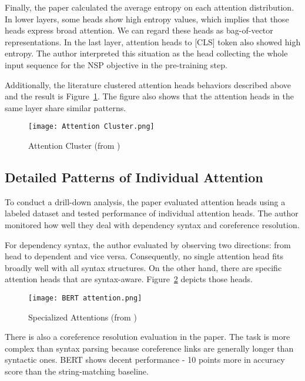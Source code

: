\documentclass[letterpaper, 11pt]{article}
\begin{document}
Finally, the paper calculated the average entropy on each attention distribution. In lower layers, some heads show high entropy values, which implies that those heads express broad attention. We can regard these heads as bag-of-vector representations. In the last layer, attention heads to [CLS] token also showed high entropy. The author interpreted this situation as the head collecting the whole input sequence for the NSP objective in the pre-training step.

Additionally, the literature clustered attention heads behaviors described above and the result is Figure~\ref{fig:attention-cluster}. The figure also shows that the attention heads in the same layer share similar patterns.

\begin{figure}
    \centering
    \texttt{[image: Attention Cluster.png]}
    \caption{Attention Cluster (from \citet{clark-etal-2019-bert})}
    \label{fig:attention-cluster}
\end{figure}

\subsection{Detailed Patterns of Individual Attention}
\label{sec:attention-analysis-depth}
To conduct a drill-down analysis, the paper evaluated attention heads using a labeled dataset and tested performance of individual attention heads. The author monitored how well they deal with dependency syntax and coreference resolution.

For dependency syntax, the author evaluated by observing two directions: from head to dependent and vice versa. Consequently, no single attention head fits broadly well with all syntax structures. On the other hand, there are specific attention heads that are syntax-aware. Figure~\ref{fig:specialized-attention} depicts those heads.

\begin{figure}
    \centering
    \texttt{[image: BERT attention.png]}
    \caption{Specialized Attentions (from \citet{clark-etal-2019-bert})}
    \label{fig:specialized-attention}
\end{figure}

There is also a coreference resolution evaluation in the paper. The task is more complex than syntax parsing because coreference links are generally longer than syntactic ones. BERT shows decent performance - 10 points more in accuracy score than the string-matching baseline.
\end{document}
